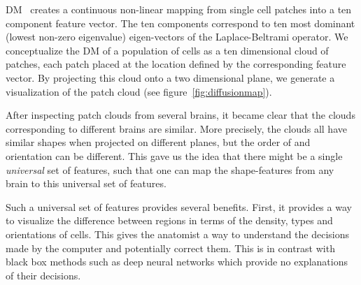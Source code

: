 \documentclass[runningheads]{llncs}
\begin{document}
DM~\cite{coifman2005geometric} creates a continuous
non-linear mapping from single cell patches into a ten component
feature vector. The ten components correspond to ten most dominant
(lowest non-zero eigenvalue) eigen-vectors of the Laplace-Beltrami
operator. We conceptualize the DM of a population of cells as
a ten dimensional cloud of patches, each patch placed at the location
defined by the corresponding feature vector. By projecting this cloud
onto a two dimensional plane, we generate a visualization of the patch
cloud (see figure~\ref{fig:diffusionmap}).

After inspecting patch clouds from several brains, it became clear
that the clouds corresponding to different brains are similar. More
precisely, the clouds all have similar shapes when projected on
different planes, but the order of and orientation can be
different. This gave us the idea that there might be a single {\em
  universal} set of features, such that one can map the shape-features from
any brain to this universal set of features.

Such a universal set of features provides several benefits. First, it
provides a way to visualize the difference between regions in terms of
the density, types and orientations of cells. This gives
the anatomist a way to understand the decisions made by the computer
and potentially correct them. This is in contrast with black box
methods such as deep neural networks which provide no explanations of
their decisions.
\end{document}
